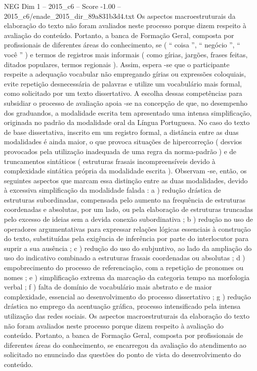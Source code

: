 \begin{textsample}{NEG Dim 1 – 2015\_c6 – Score -1.00 – 2015\_c6/enade\_2015\_dir\_89a831b3d4.txt}
Os aspectos macroestruturais da elaboração do texto não foram avaliados neste processo porque dizem respeito à avaliação do conteúdo.
Portanto, a banca de Formação Geral, composta por profissionais de diferentes áreas do conhecimento, se ( “ coisa ”, “ negócio ”, “ você ” ) e termos de registros mais informais ( como gírias, jargões, frases feitas, ditados populares, termos regionais ).
Assim, espera -se que o participante respeite a adequação vocabular não empregando gírias ou expressões coloquiais, evite repetição desnecessária de palavras e utilize um vocabulário mais formal, como solicitado por um texto dissertativo.
A escolha dessas competências para subsidiar o processo de avaliação apoia -se na concepção de que, no desempenho dos graduandos, a modalidade escrita tem apresentado uma intensa simplificação, originada no padrão da modalidade oral da Língua Portuguesa.
No caso do texto de base dissertativa, inscrito em um registro formal, a distância entre as duas modalidades é ainda maior, o que provoca situações de hipercorreção ( desvios provocados pela utilização inadequada de uma regra da norma-padrão ) e de truncamentos sintáticos ( estruturas frasais incompreensíveis devido à complexidade sintática própria da modalidade escrita ).
Observam -se, então, os seguintes aspectos que marcam essa distinção entre as duas modalidades, devido à excessiva simplificação da modalidade falada : a ) redução drástica de estruturas subordinadas, compensada pelo aumento na frequência de estruturas coordenadas e absolutas, por um lado, ou pela elaboração de estruturas truncadas pelo excesso de ideias sem a devida conexão subordinativa ; b ) redução no uso de operadores argumentativas para expressar relações lógicas essenciais à construção do texto, substituídas pela exigência de inferência por parte do interlocutor para suprir a sua ausência ; c ) redução do uso do subjuntivo, ao lado da ampliação do uso do indicativo combinado a estruturas frasais coordenadas ou absolutas ; d ) empobrecimento do processo de referenciação, com a repetição de pronomes ou nomes ; e ) simplificação extrema da marcação da categoria tempo na morfologia verbal ; f ) falta de domínio de vocabulário mais abstrato e de maior complexidade, essencial ao desenvolvimento do processo dissertativo ; g ) redução drástica no emprego da acentuação gráfica, processo intensificado pela intensa utilização das redes sociais.
Os aspectos macroestruturais da elaboração do texto não foram avaliados neste processo porque dizem respeito à avaliação do conteúdo.
Portanto, a banca de Formação Geral, composta por profissionais de diferentes áreas do conhecimento, se encarregou da avaliação do atendimento ao solicitado no enunciado das questões do ponto de vista do desenvolvimento do conteúdo.

\end{textsample}
